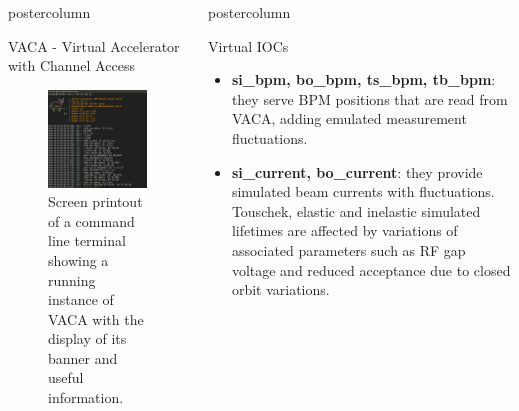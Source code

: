 \documentclass[20pt]{beamer}
\newlength{\columnheight}
\begin{document}
\begin{frame}
\begin{columns}
\begin{column}{0.45\textwidth}
\begin{beamercolorbox}[center]{postercolumn}
\begin{minipage}{.98\textwidth}
{\begin{myblock}{VACA - Virtual Accelerator with Channel Access}
\begin{figure}
							\centering
							\includegraphics[width=1.0\textwidth]{../WEPOPRPO21f1.png}
							\caption{Screen printout of a command line terminal showing a running instance of VACA with the display of its banner and useful information.}
						\end{figure}
					\end{myblock}
		}\end{minipage}\end{beamercolorbox}
	\end{column}
	\begin{column}{.55\textwidth}
		\begin{beamercolorbox}[center]{postercolumn}
			\begin{minipage}{.98\textwidth} %
				\parbox[t][\columnheight]{\textwidth}{ %
					\begin{myblock}{Virtual IOCs}
					\begin{itemize}
					\item \textbf{si\_bpm, bo\_bpm, ts\_bpm, tb\_bpm}: they serve BPM positions that are read from VACA, adding emulated measurement fluctuations.
					\item \textbf{si\_current, bo\_current}: they provide simulated beam currents with fluctuations. Touschek, elastic and inelastic simulated lifetimes are affected by variations of associated parameters such as RF gap voltage and reduced acceptance due to closed orbit variations.

\end{itemize}
\end{myblock}}
\end{minipage}
\end{beamercolorbox}
\end{column}
\end{columns}
\end{frame}
\end{document}
